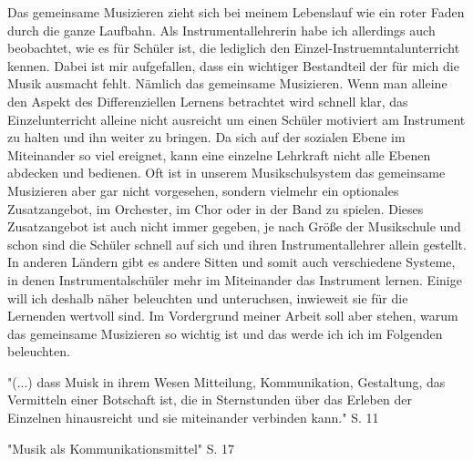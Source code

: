 Das gemeinsame Musizieren zieht sich bei meinem Lebenslauf wie ein roter Faden
durch die ganze Laufbahn. Als Instrumentallehrerin habe ich allerdings auch
beobachtet, wie es für Schüler ist, die lediglich den
Einzel-Instruemntalunterricht kennen. Dabei ist mir aufgefallen, dass ein
wichtiger Bestandteil der für mich die Musik ausmacht fehlt. Nämlich das
gemeinsame Musizieren. Wenn man alleine den Aspekt des
Differenziellen Lernens betrachtet wird schnell klar, das Einzelunterricht
alleine nicht ausreicht um einen Schüler motiviert am Instrument zu halten und
ihn weiter zu bringen. Da sich auf der sozialen Ebene im Miteinander so viel
ereignet, kann eine einzelne Lehrkraft nicht alle Ebenen abdecken und bedienen.
Oft ist in unserem Musikschulsystem das gemeinsame Musizieren aber gar nicht
vorgesehen, sondern vielmehr ein optionales Zusatzangebot, im Orchester, im Chor
oder in der Band zu spielen. Dieses Zusatzangebot ist auch nicht immer gegeben,
je nach Größe der Musikschule und schon sind die Schüler schnell auf sich und
ihren Instrumentallehrer allein gestellt. In anderen Ländern gibt es andere
Sitten und somit auch verschiedene Systeme, in denen Instrumentalschüler mehr im
Miteinander das Instrument lernen. Einige will ich deshalb näher beleuchten und
unteruchsen, inwieweit sie für die Lernenden wertvoll sind. Im Vordergrund
meiner Arbeit soll aber stehen, warum das gemeinsame Musizieren so
wichtig ist und das werde ich ich im Folgenden beleuchten. 


"(...) dass Muisk in ihrem Wesen Mitteilung, Kommunikation, Gestaltung, das
Vermitteln einer Botschaft ist, die in Sternstunden über das Erleben der
Einzelnen hinausreicht und sie miteinander verbinden kann." S. 11

"Musik als Kommunikationsmittel" S. 17

 